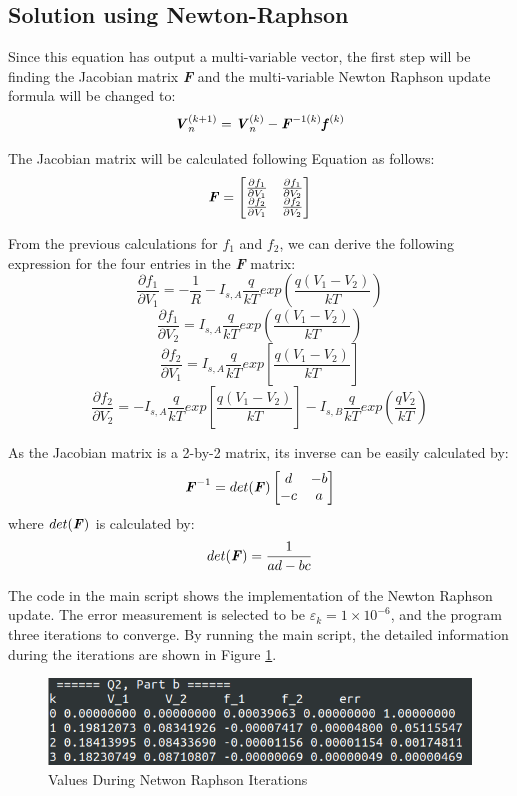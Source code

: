 \documentclass[a4paper,titlepage]{article}
\begin{document}
		\subsection{Solution using Newton-Raphson}
			Since this equation has output a multi-variable vector, the first step will be finding the Jacobian matrix \textbf{\textit{F}} and the multi-variable Newton Raphson update formula will be changed to:
			$$
				\textbf{\textit{V}}_n^{(k + 1)} = \textbf{\textit{V}}_n^{(k)} - \textbf{\textit{F}}^{-1(k)}\textbf{\textit{f}}^{(k)}
			$$
			
			The Jacobian matrix will be calculated following Equation as follows:
			\begin{equation}
				\textbf{\textit{F}} = \begin{bmatrix}
					\frac{\partial f_1}{\partial V_1} & \frac{\partial f_1}{\partial V_2} \\
					\frac{\partial f_2}{\partial V_1} & \frac{\partial f_2}{\partial V_2}
				\end{bmatrix}
			\end{equation}
			
			From the previous calculations for $f_1$ and $f_2$, we can derive the following expression for the four entries in the \textbf{\textit{F}} matrix:
			$$
				\frac{\partial f_1}{\partial V_1} = -\frac{1}{R} - I_{s, A}\frac{q}{kT}exp(\frac{q(V_1 - V_2)}{kT})
			$$
			$$
				\frac{\partial f_1}{\partial V_2} = I_{s,A}\frac{q}{kT}exp(\frac{q(V_1 - V_2)}{kT})
			$$
			$$
				\frac{\partial f_2}{\partial V_1} = I_{s,A}\frac{q}{kT}exp[\frac{q(V_1 - V_2)}{kT}]
			$$
			$$
				\frac{\partial f_2}{\partial V_2} = -I_{s, A}\frac{q}{kT}exp[\frac{q(V_1 - V_2)}{kT}] - I_{s, B}\frac{q}{kT}exp(\frac{qV_2}{kT})
			$$
			
			As the Jacobian matrix is a 2-by-2 matrix, its inverse can be easily calculated by:
			\begin{equation}
				\textbf{\textit{F}}^{-1} = det(\textbf{\textit{F}})\begin{bmatrix}
					d & -b \\
					-c & a
				\end{bmatrix}
			\end{equation}
			where $det(\textbf{\textit{F}})$ is calculated by:
			$$
				det(\textbf{\textit{F}}) = \frac{1}{ad - bc}
			$$
			
			The code in the main script shows the implementation of the Newton Raphson update. The error measurement is selected to be $\varepsilon_k = 1\times 10^{-6}$, and the program three iterations to converge. By running the main script, the detailed information during the iterations are shown in Figure \ref{diode_nr}.
			\begin{figure}[!h]
				\centering
				\includegraphics[width=\linewidth]{diode_nr}
				\caption{Values During Netwon Raphson Iterations}
				\label{diode_nr}
			\end{figure}
		
\end{document}
